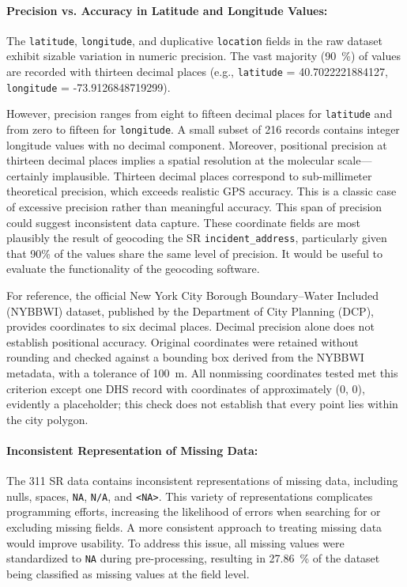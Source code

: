 \documentclass[linenumber]{jdsart}
\begin{document}
\paragraph{Precision vs. Accuracy in Latitude and Longitude Values:}
\label{par:precision}
The \texttt{latitude}, \texttt{longitude}, and duplicative
\texttt{location} fields in the raw dataset exhibit sizable
variation in numeric precision. The vast majority
(\SI{90}{\percent}) of values are recorded with thirteen
decimal places (e.g., \texttt{latitude} = 40.7022221884127,
\texttt{longitude} = -73.9126848719299).

However, precision ranges from eight to fifteen decimal places
for \texttt{latitude} and from zero to fifteen for
\texttt{longitude}. A small subset of \num{216} records contains
integer longitude values with no decimal component.
 Moreover, positional precision at thirteen decimal places
implies a spatial resolution at the molecular scale—certainly 
implausible. Thirteen decimal places correspond to sub-millimeter theoretical 
precision, which exceeds realistic GPS accuracy. This is a classic case of 
excessive precision rather than meaningful accuracy. This span of precision 
could suggest inconsistent data capture. These coordinate 
fields are most plausibly the result of geocoding the SR \texttt{incident\_address}, 
particularly given that 90\% of the values share the same level of precision.
 It would be useful to evaluate the functionality of the geocoding software. 

For reference, the official New York City Borough Boundary--Water Included
 (\textsc{NYBBWI}) dataset, published by the Department of City Planning (DCP),
provides coordinates to six decimal places. Decimal precision alone does
not establish positional accuracy. Original coordinates were retained
without rounding and checked against a bounding box derived from the
\textsc{NYBBWI} metadata, with a tolerance of \SI{100}{\meter}.
All nonmissing coordinates tested met this criterion except one DHS
record with coordinates of approximately (0, 0), evidently a placeholder;
this check does not establish that every point lies within the city polygon.

\paragraph{Inconsistent Representation of Missing Data:} 
\label{par:missingdata}
The 311 SR data contains inconsistent representations
of missing data, including nulls, spaces, \texttt{NA},
\texttt{N/A}, and \texttt{<NA>}. This variety of representations 
complicates programming efforts, increasing the likelihood 
of errors when searching for or excluding 
missing fields. A more consistent approach to treating missing data 
would improve usability. To address this issue, all missing values were standardized
to \texttt{NA} during pre-processing, resulting in 
\SI[round-mode=places, round-precision=2]{27.86}{\percent} of the 
dataset being classified as missing values at the field level.
\end{document}

